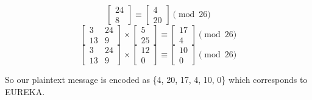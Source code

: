 \documentclass[12pt,letterpaper]{article}
\begin{document}
\begin{enumerate}
$$\begin{bmatrix*}
            24\\8
          \end{bmatrix*}
          \equiv
          \begin{bmatrix*}
            4\\20
          \end{bmatrix*}\pmod {26}
        $$
        $$
          \begin{bmatrix*}
             3 & 24 \\
            13 &  9
          \end{bmatrix*}
          \times
          \begin{bmatrix*}
            5\\25
          \end{bmatrix*}
          \equiv
          \begin{bmatrix*}
           17\\4
          \end{bmatrix*}\pmod {26}
        $$
        $$
          \begin{bmatrix*}
             3 & 24 \\
            13 &  9
          \end{bmatrix*}
          \times
          \begin{bmatrix*}
            12\\0
          \end{bmatrix*}
          \equiv
          \begin{bmatrix*}
           10\\0
          \end{bmatrix*}\pmod {26}
        $$

        So our plaintext message is encoded as \{4, 20, 17, 4, 10, 0\} which corresponds to EUREKA.


\end{enumerate}
\end{document}
